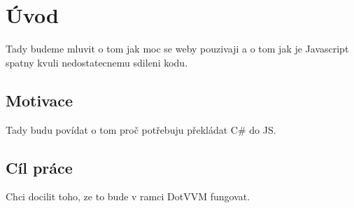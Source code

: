 \documentclass[../projekt.tex]{subfiles}
\begin{document}

\chapter{Úvod}\label{uvod}

Tady budeme mluvit o tom jak moc se weby pouzivaji a o tom jak je Javascript spatny kvuli nedostatecnemu sdileni kodu.

\section{Motivace}
Tady budu povídat o tom proč potřebuju překládat C\# do JS.

\section{Cíl práce}
Chci docilit toho, ze to bude v ramci DotVVM fungovat.
\end{document}
